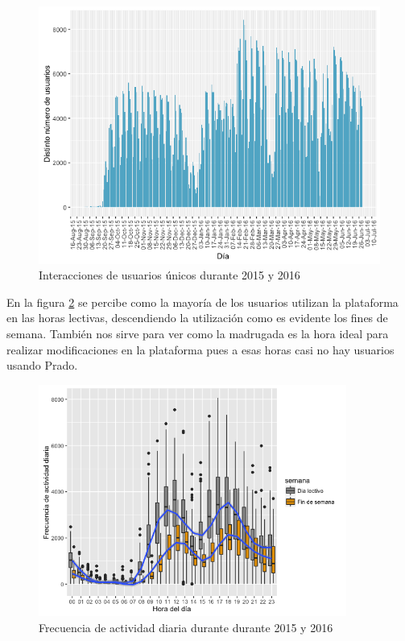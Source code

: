 \begin{figure}[H]
\centering
\includegraphics[width=1.1\textwidth]{../r/distintonumerousuarios}
\caption{Interacciones de usuarios únicos durante 2015 y 2016}
\label{fig:distintonumerousuarios}
\end{figure}



En la figura \ref{fig:frecuenciaactividaddiaria} se percibe como la mayoría de los usuarios utilizan la plataforma en las horas lectivas, descendiendo la utilización como es evidente los fines de semana. También nos sirve para ver como la madrugada es la hora ideal para realizar modificaciones en la plataforma pues a esas horas casi no hay usuarios usando Prado.

\begin{figure}[H]
\centering
\includegraphics[width=0.9\textwidth]{../r/frecuenciaactividaddiaria}
\caption{Frecuencia de actividad diaria durante durante 2015 y 2016}
\label{fig:frecuenciaactividaddiaria}
\end{figure}

